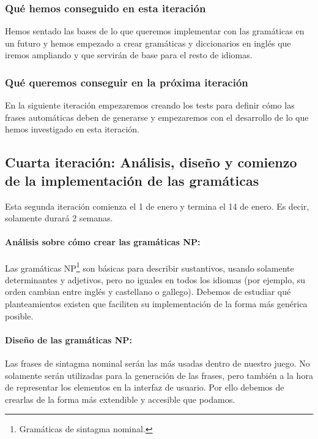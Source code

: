 \subsubsection{Qué hemos conseguido en esta iteración}

Hemos sentado las bases de lo que queremos implementar con las gramáticas en un futuro y hemos empezado a crear gramáticas y diccionarios en inglés que iremos ampliando y que servirán de base para el resto de idiomas.

\subsubsection{Qué queremos conseguir en la próxima iteración}

En la siguiente iteración empezaremos creando los tests para definir cómo las frases automáticas deben de generarse y empezaremos con el desarrollo de lo que hemos investigado en esta iteración.

\subsection{Cuarta iteración: Análisis, diseño y comienzo de la implementación de las gramáticas}

Esta segunda iteración comienza el 1 de enero y termina el 14 de enero. Es decir, solamente durará 2 semanas.

\paragraph{Análisis sobre cómo crear las gramáticas NP:} Las gramáticas NP\footnote{Gramáticas de sintagma nominal.} son básicas para describir sustantivos, usando solamente determinantes y adjetivos, pero no iguales en todos los idiomas (por ejemplo, su orden cambian entre inglés y castellano o gallego). Debemos de estudiar qué planteamientos existen que faciliten su implementación de la forma más genérica posible.

\paragraph{Diseño de las gramáticas NP:} Las frases de sintagma nominal serán las más usadas dentro de nuestro juego. No solamente serán utilizadas para la generación de las frases, pero también a la hora de representar los elementos en la interfaz de usuario. Por ello debemos de crearlas de la forma más extendible y accesible que podamos.


